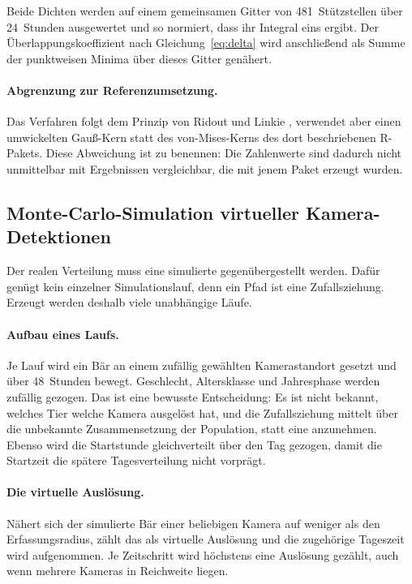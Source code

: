 \documentclass[12pt,a4paper]{report}
\begin{document}
Beide Dichten werden auf einem gemeinsamen Gitter von 481~Stützstellen über 24~Stunden
ausgewertet und so normiert, dass ihr Integral eins ergibt. Der Überlappungskoeffizient nach
Gleichung~\eqref{eq:delta} wird anschließend als Summe der punktweisen Minima über dieses
Gitter genähert.

\paragraph{Abgrenzung zur Referenzumsetzung.} Das Verfahren folgt dem Prinzip von Ridout und
Linkie \cite{RidoutLinkie2009}, verwendet aber einen umwickelten Gauß-Kern statt des
von-Mises-Kerns des dort beschriebenen R-Pakets. Diese Abweichung ist zu benennen: Die
Zahlenwerte sind dadurch nicht unmittelbar mit Ergebnissen vergleichbar, die mit jenem Paket
erzeugt wurden.

\subsection{Monte-Carlo-Simulation virtueller Kamera-Detektionen}
\label{subsec:montecarlo}

Der realen Verteilung muss eine simulierte gegenübergestellt werden. Dafür genügt kein
einzelner Simulationslauf, denn ein Pfad ist eine Zufallsziehung. Erzeugt werden deshalb
viele unabhängige Läufe.

\paragraph{Aufbau eines Laufs.} Je Lauf wird ein Bär an einem zufällig gewählten
Kamerastandort gesetzt und über 48~Stunden bewegt. Geschlecht, Altersklasse und Jahresphase
werden zufällig gezogen. Das ist eine bewusste Entscheidung: Es ist nicht bekannt, welches
Tier welche Kamera ausgelöst hat, und die Zufallsziehung mittelt über die unbekannte
Zusammensetzung der Population, statt eine anzunehmen. Ebenso wird die Startstunde
gleichverteilt über den Tag gezogen, damit die Startzeit die spätere Tagesverteilung nicht
vorprägt.

\paragraph{Die virtuelle Auslösung.} Nähert sich der simulierte Bär einer beliebigen Kamera
auf weniger als den Erfassungsradius, zählt das als virtuelle Auslösung und die zugehörige
Tageszeit wird aufgenommen. Je Zeitschritt wird höchstens eine Auslösung gezählt, auch wenn
mehrere Kameras in Reichweite liegen.
\end{document}
